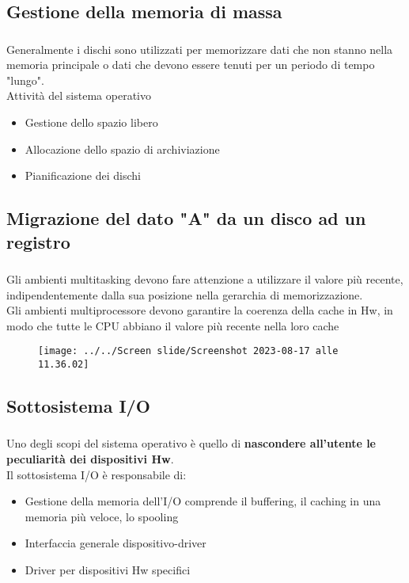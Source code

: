 \documentclass{beamer}
\newenvironment{mainframe}{
	\begin{frame}
		\frametitle{\insertsubsection}
		\framesubtitle{\insertsection}
	}{
	\end{frame}
}
\begin{document}
\subsection{Gestione della memoria di massa}
\begin{mainframe}
	Generalmente i dischi sono utilizzati per memorizzare dati che non stanno nella memoria principale o dati che devono essere tenuti per un periodo di tempo "lungo".\\
	Attività del sistema operativo
	\begin{itemize}
		\item Gestione dello spazio libero
		\item Allocazione dello spazio di archiviazione
		\item Pianificazione dei dischi
	\end{itemize}
\end{mainframe}
\subsection{Migrazione del dato "A" da un disco ad un registro}
\begin{mainframe}
	Gli ambienti multitasking devono fare attenzione a utilizzare il valore più recente, indipendentemente dalla sua posizione nella gerarchia di memorizzazione.\\
	Gli ambienti multiprocessore devono garantire la coerenza della cache in Hw, in modo che tutte le CPU abbiano il valore più recente nella loro cache
	\begin{figure}
		\centering
		\texttt{[image: ../../Screen slide/Screenshot 2023-08-17 alle 11.36.02]}
	\end{figure}
\end{mainframe}
\subsection{Sottosistema I/O}
\begin{mainframe}
	Uno degli scopi del sistema operativo è quello di \textbf{nascondere all'utente le peculiarità dei dispositivi Hw}.\\
	Il sottosistema I/O è responsabile di:
	\begin{itemize}
		\item Gestione della memoria dell'I/O comprende il buffering, il caching in una memoria più veloce, lo spooling
		\item Interfaccia generale dispositivo-driver
		\item Driver per dispositivi Hw specifici
	\end{itemize}
\end{mainframe}
\end{document}
